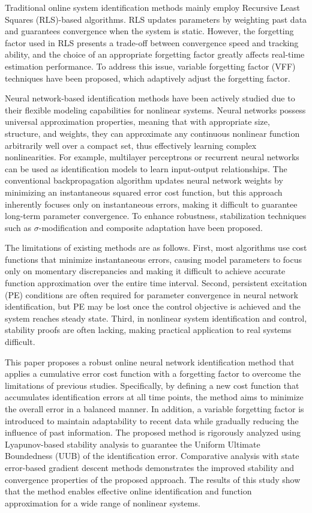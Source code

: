 \documentclass[10pt,twocolumn]{ICCAS}
\begin{document}
Traditional online system identification methods mainly employ Recursive Least Squares (RLS)-based algorithms. RLS updates parameters by weighting past data and guarantees convergence when the system is static. However, the forgetting factor used in RLS presents a trade-off between convergence speed and tracking ability, and the choice of an appropriate forgetting factor greatly affects real-time estimation performance. To address this issue, variable forgetting factor (VFF) techniques have been proposed, which adaptively adjust the forgetting factor.

Neural network-based identification methods have been actively studied due to their flexible modeling capabilities for nonlinear systems. Neural networks possess universal approximation properties, meaning that with appropriate size, structure, and weights, they can approximate any continuous nonlinear function arbitrarily well over a compact set, thus effectively learning complex nonlinearities. For example, multilayer perceptrons or recurrent neural networks can be used as identification models to learn input-output relationships. 
The conventional backpropagation algorithm updates neural network weights by minimizing an instantaneous squared error cost function, but this approach inherently focuses only on instantaneous errors, making it difficult to guarantee long-term parameter convergence. To enhance robustness, stabilization techniques such as $\sigma$-modification and composite adaptation have been proposed.

The limitations of existing methods are as follows. First, most algorithms use cost functions that minimize instantaneous errors, causing model parameters to focus only on momentary discrepancies and making it difficult to achieve accurate function approximation over the entire time interval. Second, persistent excitation (PE) conditions are often required for parameter convergence in neural network identification, but PE may be lost once the control objective is achieved and the system reaches steady state. Third, in nonlinear system identification and control, stability proofs are often lacking, making practical application to real systems difficult.

This paper proposes a robust online neural network identification method that applies a cumulative error cost function with a forgetting factor to overcome the limitations of previous studies. Specifically, by defining a new cost function that accumulates identification errors at all time points, the method aims to minimize the overall error in a balanced manner. In addition, a variable forgetting factor is introduced to maintain adaptability to recent data while gradually reducing the influence of past information. The proposed method is rigorously analyzed using Lyapunov-based stability analysis to guarantee the Uniform Ultimate Boundedness (UUB) of the identification error. Comparative analysis with state error-based gradient descent methods demonstrates the improved stability and convergence properties of the proposed approach. The results of this study show that the method enables effective online identification and function approximation for a wide range of nonlinear systems.
\end{document}
